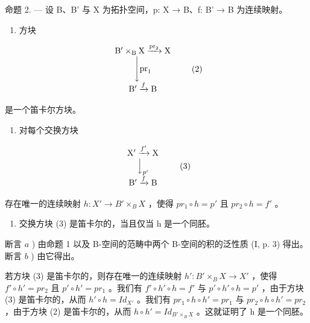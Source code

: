 命题 2. --- 设 B、B' 与 X 为拓扑空间，p: X → B、f: B' → B 为连续映射。

\begin{enumerate}
\def\labelenumi{\alph{enumi})}
\tightlist
\item
  方块
\end{enumerate}

\[
\begin{array}{c} \mathrm{B} ^ {\prime} \times_ {\mathrm{B}} \mathrm{X} \xrightarrow {\mathrm{pr} _ {2}} \mathrm{X} \\ \Biggl \downarrow \mathrm{pr} _ {1} \\ \mathrm{B} ^ {\prime} \xrightarrow {f} \mathrm{B} \end{array}\tag{2}
\]

是一个笛卡尔方块。

\begin{enumerate}
\def\labelenumi{\alph{enumi})}
\setcounter{enumi}{1}
\tightlist
\item
  对每个交换方块
\end{enumerate}

\[
\begin{array}{c} \mathrm {X^ {\prime}} \xrightarrow {f ^ {\prime}} \mathrm{X} \\ \Big \downarrow_ {p ^ {\prime}} \\ \mathrm {B^ {\prime}} \xrightarrow {f} \mathrm{B} \end{array}\tag{3}
\]

存在唯一的连续映射 \(h: X' \to B' \times_{B} X\) ，使得 \(pr_{1} \circ h = p'\) 且 \(pr_{2} \circ h = f'\) 。

\begin{enumerate}
\def\labelenumi{\alph{enumi})}
\setcounter{enumi}{2}
\tightlist
\item
  交换方块 (3) 是笛卡尔的，当且仅当 h 是一个同胚。
\end{enumerate}

断言 \(a\) ) 由命题 1 以及 B-空间的范畴中两个 B-空间的积的泛性质 (I, p. 3) 得出。断言 \(b\) ) 由它得出。

若方块 (3) 是笛卡尔的，则存在唯一的连续映射 \(h'\colon B'\times_{B}X\to X'\) ，使得 \(f'\circ h' = pr_{2}\) 且 \(p'\circ h' = pr_{1}\) 。我们有 \(f'\circ h'\circ h = f'\) 与 \(p'\circ h'\circ h = p'\) ，由于方块 (3) 是笛卡尔的，从而 \(h'\circ h = Id_{X'}\) 。我们有 \(pr_{1}\circ h\circ h' = pr_{1}\) 与 \(pr_{2}\circ h\circ h' = pr_{2}\) ，由于方块 (2) 是笛卡尔的，从而 \(h\circ h' = Id_{B'\times_{B}X}\) 。这就证明了 h 是一个同胚。

